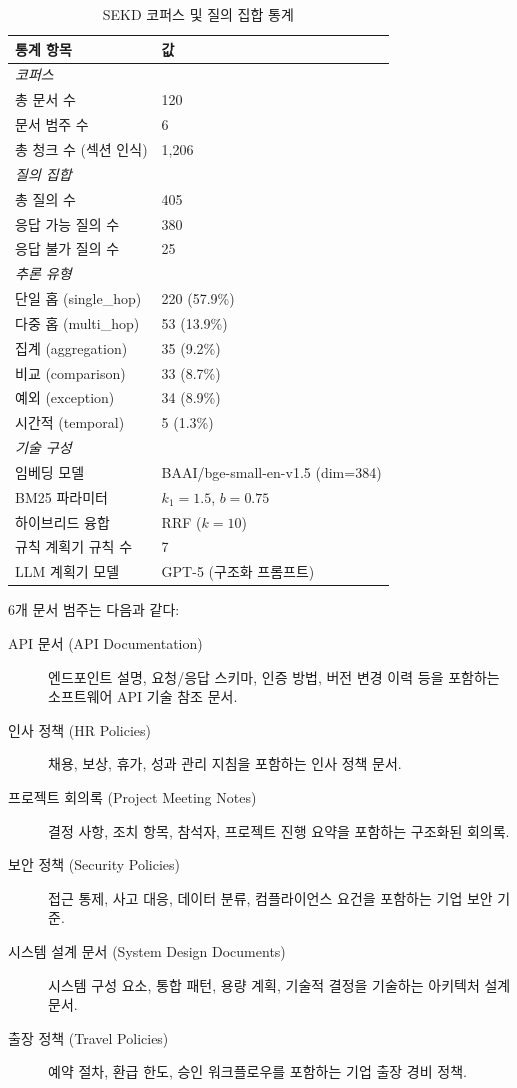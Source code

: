 \begin{table}[htbp]
\centering
\caption{SEKD 코퍼스 및 질의 집합 통계}
\label{tab:dataset_ko}
\begin{tabular}{ll}
\toprule
\textbf{통계 항목} & \textbf{값} \\
\midrule
\multicolumn{2}{l}{\textit{코퍼스}} \\
\quad 총 문서 수 & 120 \\
\quad 문서 범주 수 & 6 \\
\quad 총 청크 수 (섹션 인식) & 1{,}206 \\
\midrule
\multicolumn{2}{l}{\textit{질의 집합}} \\
\quad 총 질의 수 & 405 \\
\quad 응답 가능 질의 수 & 380 \\
\quad 응답 불가 질의 수 & 25 \\
\midrule
\multicolumn{2}{l}{\textit{추론 유형}} \\
\quad 단일 홉 (single\_hop) & 220 (57.9\%) \\
\quad 다중 홉 (multi\_hop) & 53 (13.9\%) \\
\quad 집계 (aggregation) & 35 (9.2\%) \\
\quad 비교 (comparison) & 33 (8.7\%) \\
\quad 예외 (exception) & 34 (8.9\%) \\
\quad 시간적 (temporal) & 5 (1.3\%) \\
\midrule
\multicolumn{2}{l}{\textit{기술 구성}} \\
\quad 임베딩 모델 & BAAI/bge-small-en-v1.5 (dim=384) \\
\quad BM25 파라미터 & $k_1{=}1.5$, $b{=}0.75$ \\
\quad 하이브리드 융합 & RRF ($k{=}10$) \\
\quad 규칙 계획기 규칙 수 & 7 \\
\quad LLM 계획기 모델 & GPT-5 (구조화 프롬프트) \\
\bottomrule
\end{tabular}
\end{table}

6개 문서 범주는 다음과 같다:

\begin{description}
    \item[API 문서 (API Documentation)] 엔드포인트 설명, 요청/응답 스키마, 인증 방법, 버전 변경 이력 등을 포함하는 소프트웨어 API 기술 참조 문서.
    \item[인사 정책 (HR Policies)] 채용, 보상, 휴가, 성과 관리 지침을 포함하는 인사 정책 문서.
    \item[프로젝트 회의록 (Project Meeting Notes)] 결정 사항, 조치 항목, 참석자, 프로젝트 진행 요약을 포함하는 구조화된 회의록.
    \item[보안 정책 (Security Policies)] 접근 통제, 사고 대응, 데이터 분류, 컴플라이언스 요건을 포함하는 기업 보안 기준.
    \item[시스템 설계 문서 (System Design Documents)] 시스템 구성 요소, 통합 패턴, 용량 계획, 기술적 결정을 기술하는 아키텍처 설계 문서.
    \item[출장 정책 (Travel Policies)] 예약 절차, 환급 한도, 승인 워크플로우를 포함하는 기업 출장 경비 정책.
\end{description}

